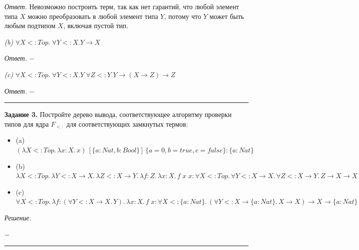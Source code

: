 \documentclass[landscape, 11pt]{report}
\begin{document}
	\vspace{0.2cm}
	
	\textit{Ответ.} Невозможно построить терм, так как нет гарантий, что любой элемент типа $X$ можно преобразовать в любой элемент типа $Y$, потому что $Y$ может быть любым подтипом $X$, включая пустой тип.
	
	\vspace{0.2cm}
	
	\textit{(b) $\forall X <: Top. \; \forall Y <: X . Y \rightarrow X$}
	
	\vspace{0.2cm}
	
	\textit{Ответ.} $-$

	\vspace{0.2cm}

	\textit{(c) $\forall X <: Top. \; \forall Y <: X . Y \; \forall Z <: Y. Y \rightarrow (X \rightarrow Z) \rightarrow Z$}

	\vspace{0.2cm}

	\textit{Ответ.} $-$

	\vspace{0.5cm}
	\hrule
	\vspace{0.5cm}

	
	\textbf{Задание 3.} Постройте дерево вывода, соответствующее алгоритму проверки типов для ядра $F_{<:}$ для соответствующих замкнутых термов:
	
	\begin{itemize}
		\item[] (a) $(\lambda X <: Top. \, \lambda x : X . \, x ) \, [\{a : Nat, b : Bool \}] \, \{a = 0, b = true, c = false\} : 
		\{a : Nat\} $
		\item[] (b) $\lambda X <: Top . \, \lambda Y <: X \rightarrow X . \, \lambda Z <: X \rightarrow Y . \, \lambda f : Z . \, \lambda x : X . \, f \; x \; x : \forall X <: Top . \, \forall Y <: X \rightarrow X . \,\forall Z <: X \rightarrow Y . \, Z \rightarrow X \rightarrow X$
		\item[] (c) $\forall X <: Top . \, \lambda f : (\forall Y <: X \rightarrow X . \, Y) . \, \lambda x : X . \, f \; x : \forall X <: \{a : Nat\} . \, (\forall Y <: X \rightarrow \{a : Nat\} . \, X \rightarrow X) \rightarrow X \rightarrow \{a : Nat\}$
	\end{itemize}
	
	\vspace{0.2cm}
	
	\textit{Решение.}
	
	\begin{center}
		$-$
	\end{center}
	
	\hrule
\end{document}
